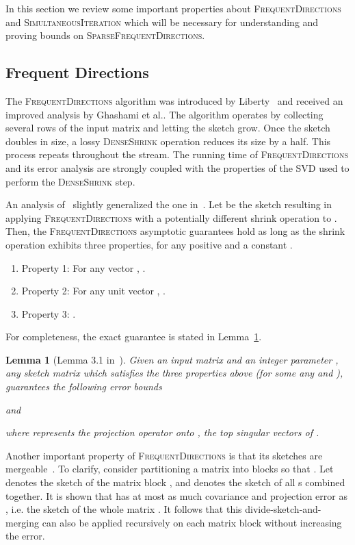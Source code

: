 \documentclass[11pt]{article}
\newcommand{\fd}{\textsc{FrequentDirections}\xspace}
\newcommand{\sfd}{\textsc{SparseFrequentDirections}\xspace}
\newcommand{\si}{\textsc{SimultaneousIteration}\xspace}
\newtheorem{lemma}{Lemma}[section]
\begin{document}
In this section we review some important properties about \fd and \si which will be necessary for understanding and proving bounds on  \sfd.  

\subsection{Frequent Directions}
\label{related:fd}

The \fd algorithm was introduced by Liberty~\cite{liberty2013simple} and received an improved analysis by Ghashami et al.\cite{ghashami2015frequent}. 
The algorithm operates by collecting several rows of the input matrix and letting the sketch grow.
Once the sketch doubles in size, a lossy \textsc{DenseShrink} operation reduces its size by a half.
This process repeats throughout the stream.
The running time of \fd and its error analysis are strongly coupled with the properties of the 
SVD used to perform the \textsc{DenseShrink} step.

An analysis of~\cite{desai2015improved} slightly generalized the one in~\cite{ghashami2015frequent}.
Let  be the sketch resulting in applying \fd with a potentially different shrink operation to . 
Then, the \fd asymptotic guarantees hold as long as the shrink operation exhibits three properties, for any positive  and a constant .
\begin{enumerate} \item Property 1:  For any vector , .
\item Property 2: For any unit vector , .
\item Property 3: .
\end{enumerate}
For completeness, the exact guarantee is stated in Lemma~\ref{lem:desai}.

\begin{lemma}[Lemma 3.1 in~\cite{desai2015improved}]\label{lem:desai}
Given an input  matrix  and an integer parameter , any sketch  matrix  which satisfies the three properties above (for some any  and ),
guarantees the following error bounds

and

where  represents the projection operator onto , the top  singular vectors of .  
\end{lemma}

Another important property of \fd is that its sketches are mergeable~\cite{ghashami2015frequent}. To clarify, consider partitioning a matrix  into  blocks  so that . Let  denotes the  sketch of the matrix block , and  denotes the  sketch of all s combined together.
It is shown that  has at most as much covariance and projection error as , i.e. the sketch of the whole matrix . It follows that this divide-sketch-and-merging can also be applied recursively on each matrix block without increasing the error.
\end{document}
